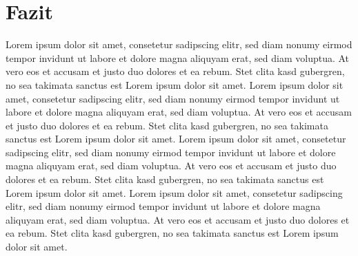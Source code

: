 \documentclass[conference]{IEEEtran}
\begin{document}
\section{Fazit}
\label{Fazit}
Lorem ipsum dolor sit amet, consetetur sadipscing elitr, sed diam nonumy eirmod tempor invidunt ut labore et dolore magna aliquyam erat, sed diam voluptua. At vero eos et accusam et justo duo dolores et ea rebum. Stet clita kasd gubergren, no sea takimata sanctus est Lorem ipsum dolor sit amet. Lorem ipsum dolor sit amet, consetetur sadipscing elitr, sed diam nonumy eirmod tempor invidunt ut labore et dolore magna aliquyam erat, sed diam voluptua. At vero eos et accusam et justo duo dolores et ea rebum. Stet clita kasd gubergren, no sea takimata sanctus est Lorem ipsum dolor sit amet. Lorem ipsum dolor sit amet, consetetur sadipscing elitr, sed diam nonumy eirmod tempor invidunt ut labore et dolore magna aliquyam erat, sed diam voluptua. At vero eos et accusam et justo duo dolores et ea rebum. Stet clita kasd gubergren, no sea takimata sanctus est Lorem ipsum dolor sit amet. Lorem ipsum dolor sit amet, consetetur sadipscing elitr, sed diam nonumy eirmod tempor invidunt ut labore et dolore magna aliquyam erat, sed diam voluptua. At vero eos et accusam et justo duo dolores et ea rebum. Stet clita kasd gubergren, no sea takimata sanctus est Lorem ipsum dolor sit amet.



\end{document}
